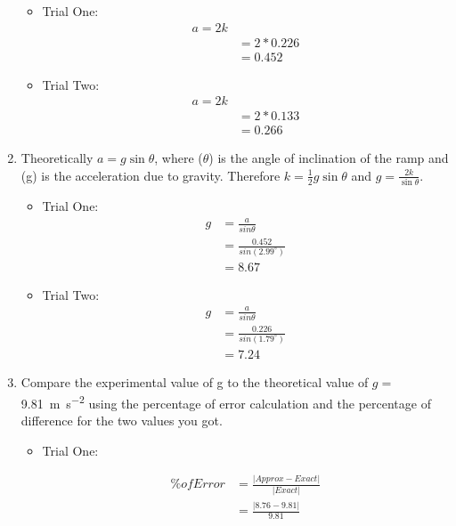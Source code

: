\documentclass[12pt]{article}
\begin{document}
\begin{enumerate}
    \begin{itemize}
        \item Trial One:
        \begin{align*}
            a=2k\\
           & =2*0.226\\
            &=0.452
        \end{align*}
        \item Trial Two:
        \begin{align*}
            a=2k\\
            &=2*0.133\\
            &=0.266
        \end{align*}
    \end{itemize}
    \item Theoretically $a=g\sin\theta$, where ($\theta$) is the angle of inclination of the ramp and (g) is the acceleration due to gravity. Therefore $k=\frac{1}{2}g\sin\theta$ and $g=\frac{2k}{\sin\theta}$.
    \begin{itemize}
        \item Trial One:
        \begin{align*}
            g&=\frac{a}{sin\theta}\\
             &=\frac{0.452}{sin(2.99^{\circ})}\\
             &=8.67
        \end{align*}
        \item Trial Two:
        \begin{align*}
            g&=\frac{a}{sin\theta}\\
             &=\frac{0.226}{sin(1.79^{\circ})}\\
             &=7.24
        \end{align*}
    \end{itemize}
    \item Compare the experimental value of g to the theoretical value of $g=$\SI{9.81}{\metre\per\second\squared} using the percentage of error calculation and the percentage of difference for the two values you got.
    \begin{itemize}
        \item Trial One:
        \begin{multicols}{2}
            \begin{align*}
                \% of Error &= \frac{|Approx - Exact|}{|Exact|}\\
                &=\frac{|8.76-9.81|}{9.81}\\

\end{align*}
\end{multicols}
\end{itemize}
\end{enumerate}
\end{document}
